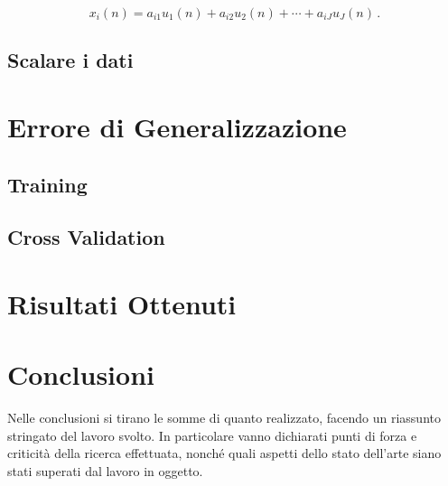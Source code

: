 \documentclass[12pt,italian]{report}
\begin{document}
\begin{equation}
x_i(n) = a_{i1}u_1(n) + a_{i2}u_2(n) + \cdots + a_{iJ}u_J(n) \, .
\label{eq:multimix}
\end{equation}

\subsection{Scalare i dati}


\section{Errore di Generalizzazione}
\label{sec:errore}


\subsection{Training}



\subsection{Cross Validation}



\section{Risultati Ottenuti}
\label{sec:risultati}


% 
% 
\section{Conclusioni}

Nelle conclusioni si tirano le somme di quanto realizzato, facendo un riassunto stringato del lavoro svolto. In particolare vanno dichiarati punti di forza e criticità della ricerca effettuata, nonché quali aspetti dello stato dell'arte siano stati superati dal lavoro in oggetto.

%
%





\closingpage
\end{document}
